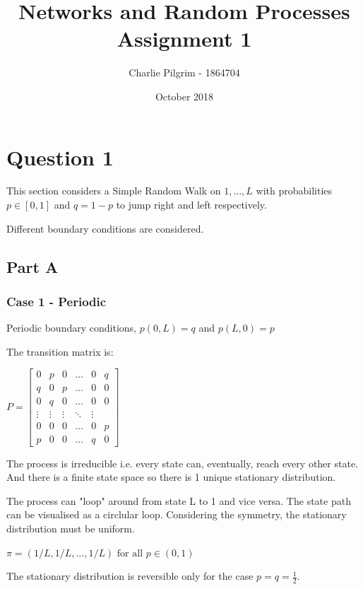 \documentclass{article}
\title{Networks and Random Processes Assignment 1}
\author{Charlie Pilgrim - 1864704}
\date{October 2018}
\begin{document}
\maketitle


\section{Question 1}

This section considers a Simple Random Walk on ${1,...,L}$ with probabilities $p \in [0,1]$ and $q = 1-p$ to jump right and left respectively. 

Different boundary conditions are considered.

\subsection{Part A}

\subsubsection{Case 1 - Periodic}

Periodic boundary conditions, $p(0,L) = q$ and $p(L,0) = p$

The transition matrix is:

\bigskip

$P = \begin{bmatrix}
    0 & p & 0 & \dots  & 0 & q \\
    q & 0 & p & \dots  & 0 & 0\\
    0 & q & 0 & \dots  & 0 & 0\\
    \vdots & \vdots & \vdots & \ddots & \vdots \\
    0 & 0 & 0 & \dots & 0 & p \\
    p & 0 & 0 & \dots & q & 0
\end{bmatrix}$

\bigskip

The process is irreducible i.e. every state can, eventually, reach every other state. And there is a finite state space so there is 1 unique stationary distribution.

The process can "loop" around from state L to 1 and vice versa. The state path can be visualised as a circlular loop. Considering the symmetry, the stationary distribution must be uniform. 

$\pi = (1/L, 1/L,..., 1/L) \text{ for all } p \in (0,1)$ 

The stationary distribution is reversible only for the case $p=q=\frac{1}{2}$.
\end{document}
